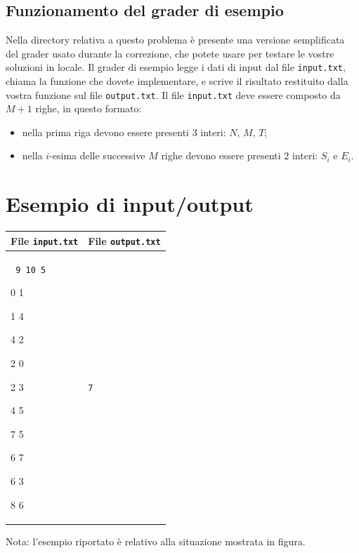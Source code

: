 \documentclass[a4paper,11pt]{article}
\newcommand{\file}[1]{\texttt{#1}}
\newcommand{\esempio}[2]{
\noindent\begin{minipage}{\textwidth}
\begin{tabular}{|p{11cm}|p{5cm}|}
    \hline
    \textbf{File \file{input.txt}} & \textbf{File \file{output.txt}}\\
    \hline
    \tt \small #1 &
    \tt \small #2 \\
    \hline
\end{tabular}
\end{minipage}
}
\begin{document}
\subsection*{Funzionamento del grader di esempio}
Nella directory relativa a questo problema è presente una versione
semplificata del grader usato durante la correzione, che potete usare
per testare le vostre soluzioni in locale. Il grader di esempio legge
i dati di input dal file \file{input.txt}, chiama la funzione che
dovete implementare, e scrive il risultato restituito dalla vostra
funzione sul file \file{output.txt}. Il file \file{input.txt} deve
essere composto da $M+1$ righe, in questo formato:
\begin{itemize}
\item nella prima riga devono essere presenti 3 interi: $N$, $M$, $T$;
\item nella $i$-esima delle successive $M$ righe devono essere presenti 2 interi: $S_i$ e $E_i$.
\end{itemize}


\section*{Esempio di input/output}

\esempio{
9 10 5

0 1

1 4

4 2

2 0

2 3

4 5

7 5

6 7

6 3

8 6
}{7}


Nota: l'esempio riportato è relativo alla situazione mostrata in figura.
\end{document}

